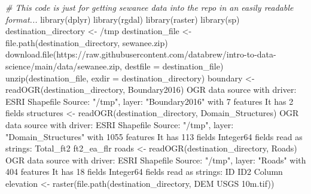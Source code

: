 \documentclass[
]{book}
\newenvironment{Shaded}{\begin{snugshade}}{\end{snugshade}}
\newcommand{\AttributeTok}[1]{\textcolor[rgb]{0.77,0.63,0.00}{#1}}
\newcommand{\CommentTok}[1]{\textcolor[rgb]{0.56,0.35,0.01}{\textit{#1}}}
\newcommand{\DecValTok}[1]{\textcolor[rgb]{0.00,0.00,0.81}{#1}}
\newcommand{\FunctionTok}[1]{\textcolor[rgb]{0.00,0.00,0.00}{#1}}
\newcommand{\NormalTok}[1]{#1}
\newcommand{\OtherTok}[1]{\textcolor[rgb]{0.56,0.35,0.01}{#1}}
\newcommand{\SpecialCharTok}[1]{\textcolor[rgb]{0.00,0.00,0.00}{#1}}
\newcommand{\StringTok}[1]{\textcolor[rgb]{0.31,0.60,0.02}{#1}}
\begin{document}
\begin{Shaded}
\begin{Highlighting}[]

\CommentTok{\# This code is just for getting sewanee data into the repo in an easily readable format...}
\FunctionTok{library}\NormalTok{(dplyr)}
\FunctionTok{library}\NormalTok{(rgdal)}
\FunctionTok{library}\NormalTok{(raster)}
\FunctionTok{library}\NormalTok{(sp)}
\NormalTok{destination\_directory }\OtherTok{\textless{}{-}} \StringTok{\textquotesingle{}/tmp\textquotesingle{}}
\NormalTok{destination\_file }\OtherTok{\textless{}{-}} \FunctionTok{file.path}\NormalTok{(destination\_directory, }\StringTok{\textquotesingle{}sewanee.zip\textquotesingle{}}\NormalTok{)}
\FunctionTok{download.file}\NormalTok{(}\StringTok{\textquotesingle{}https://raw.githubusercontent.com/databrew/intro{-}to{-}data{-}science/main/data/sewanee.zip\textquotesingle{}}\NormalTok{,}
              \AttributeTok{destfile =}\NormalTok{ destination\_file)}
\FunctionTok{unzip}\NormalTok{(destination\_file, }\AttributeTok{exdir =}\NormalTok{ destination\_directory)}
\NormalTok{boundary }\OtherTok{\textless{}{-}} \FunctionTok{readOGR}\NormalTok{(destination\_directory, }\StringTok{\textquotesingle{}Boundary2016\textquotesingle{}}\NormalTok{)}
\NormalTok{OGR data source with driver}\SpecialCharTok{:}\NormalTok{ ESRI Shapefile }
\NormalTok{Source}\SpecialCharTok{:} \StringTok{"/tmp"}\NormalTok{, layer}\SpecialCharTok{:} \StringTok{"Boundary2016"}
\NormalTok{with }\DecValTok{7}\NormalTok{ features}
\NormalTok{It has }\DecValTok{2}\NormalTok{ fields}
\NormalTok{structures }\OtherTok{\textless{}{-}} \FunctionTok{readOGR}\NormalTok{(destination\_directory, }\StringTok{\textquotesingle{}Domain\_Structures\textquotesingle{}}\NormalTok{)}
\NormalTok{OGR data source with driver}\SpecialCharTok{:}\NormalTok{ ESRI Shapefile }
\NormalTok{Source}\SpecialCharTok{:} \StringTok{"/tmp"}\NormalTok{, layer}\SpecialCharTok{:} \StringTok{"Domain\_Structures"}
\NormalTok{with }\DecValTok{1055}\NormalTok{ features}
\NormalTok{It has }\DecValTok{113}\NormalTok{ fields}
\NormalTok{Integer64 fields read as strings}\SpecialCharTok{:}\NormalTok{  Total\_ft2 ft2\_ea\_flr }
\NormalTok{roads }\OtherTok{\textless{}{-}} \FunctionTok{readOGR}\NormalTok{(destination\_directory, }\StringTok{\textquotesingle{}Roads\textquotesingle{}}\NormalTok{)}
\NormalTok{OGR data source with driver}\SpecialCharTok{:}\NormalTok{ ESRI Shapefile }
\NormalTok{Source}\SpecialCharTok{:} \StringTok{"/tmp"}\NormalTok{, layer}\SpecialCharTok{:} \StringTok{"Roads"}
\NormalTok{with }\DecValTok{404}\NormalTok{ features}
\NormalTok{It has }\DecValTok{18}\NormalTok{ fields}
\NormalTok{Integer64 fields read as strings}\SpecialCharTok{:}\NormalTok{  ID ID2 Column }
\NormalTok{elevation }\OtherTok{\textless{}{-}} \FunctionTok{raster}\NormalTok{(}\FunctionTok{file.path}\NormalTok{(destination\_directory,}
                              \StringTok{\textquotesingle{}DEM USGS 10m.tif\textquotesingle{}}\NormalTok{))}
\end{Highlighting}
\end{Shaded}
\end{document}
